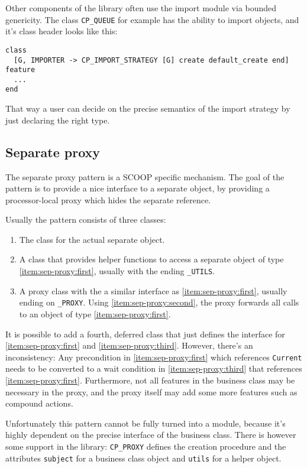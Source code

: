 \documentclass[a4paper,10pt]{report}
\begin{document}
Other components of the library often use the import module via bounded genericity.
The class \lstinline!CP_QUEUE! for example has the ability to import objects, and it's class header looks like this:
\begin{lstlisting}
class
  [G, IMPORTER -> CP_IMPORT_STRATEGY [G] create default_create end]
feature
  ...
end
\end{lstlisting}
That way a user can decide on the precise semantics of the import strategy by just declaring the right type.

\subsection{Separate proxy}

The separate proxy pattern is a SCOOP specific mechanism.
The goal of the pattern is to provide a nice interface to a separate object, by providing a processor-local proxy which hides the separate reference.

Usually the pattern consists of three classes:
\begin{enumerate} [label=(\arabic*)]
 \item\label{item:sep-proxy:first} The class for the actual separate object.
 \item\label{item:sep-proxy:second} A class that provides helper functions to access a separate object of type \ref{item:sep-proxy:first}, usually with the ending \lstinline!_UTILS!.
 \item\label{item:sep-proxy:third} A proxy class with the a similar interface as \ref{item:sep-proxy:first}, usually ending on \lstinline!_PROXY!.
 Using \ref{item:sep-proxy:second}, the proxy forwards all calls to an object of type \ref{item:sep-proxy:first}.
\end{enumerate}


It is possible to add a fourth, deferred class that just defines the interface for \ref{item:sep-proxy:first} and \ref{item:sep-proxy:third}.
However, there's an inconsistency: 
Any precondition in \ref{item:sep-proxy:first} which references \lstinline!Current! needs to be converted to a wait condition in \ref{item:sep-proxy:third} that references \ref{item:sep-proxy:first}.
Furthermore, not all features in the business class may be necessary in the proxy, and the proxy itself may add some more features such as compound actions.

Unfortunately this pattern cannot be fully turned into a module, because it's highly dependent on the precise interface of the business class.
There is however some support in the library: 
\lstinline!CP_PROXY! defines the creation procedure and the attributes \lstinline!subject! for a business class object and \lstinline!utils! for a helper object.
\end{document}
